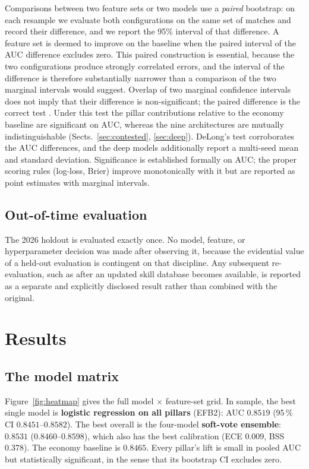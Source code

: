 \documentclass[11pt,a4paper]{article}
\begin{document}
Comparisons between two feature sets or two models use a \emph{paired} bootstrap: on each
resample we evaluate both configurations on the same set of matches and record their
difference, and we report the 95\% interval of that difference. A feature set is deemed to
improve on the baseline when the paired interval of the AUC difference excludes zero. This
paired construction is essential, because the two configurations produce strongly
correlated errors, and the interval of the difference is therefore substantially narrower
than a comparison of the two marginal intervals would suggest. Overlap of two marginal
confidence intervals does not imply that their difference is non-significant; the paired
difference is the correct test \cite{delong1988comparing}. Under this test the pillar
contributions relative to the economy baseline are significant on AUC, whereas the nine
architectures are mutually indistinguishable (Sects.~\ref{sec:contested}, \ref{sec:deep}).
DeLong's test corroborates the AUC differences, and the deep models additionally report a
multi-seed mean and standard deviation. Significance is established formally on AUC; the
proper scoring rules (log-loss, Brier) improve monotonically with it but are reported as
point estimates with marginal intervals.

\subsection{Out-of-time evaluation}
The 2026 holdout is evaluated exactly once. No model, feature, or hyperparameter decision
was made after observing it, because the evidential value of a held-out evaluation is
contingent on that discipline. Any subsequent re-evaluation, such as after an updated
skill database becomes available, is reported as a separate and explicitly disclosed
result rather than combined with the original.

\section{Results}
\label{sec:results}

\subsection{The model matrix}
\label{sec:matrix}

Figure~\ref{fig:heatmap} gives the full model $\times$ feature-set grid. In sample, the
best single model is \textbf{logistic regression on all pillars} (EFB2): AUC $0.8519$
(95\,\% CI $0.8451$--$0.8582$). The best overall is the four-model \textbf{soft-vote
ensemble}: $0.8531$ ($0.8460$--$0.8598$), which also has the best calibration (ECE $0.009$,
BSS $0.378$). The economy baseline is $0.8465$. Every pillar's lift is small in pooled AUC
but statistically significant, in the sense that its bootstrap CI excludes zero.
\end{document}
